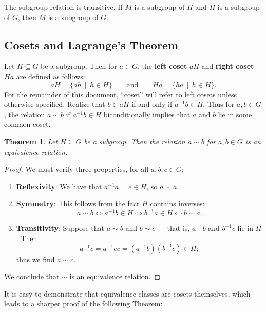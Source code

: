 \documentclass[11pt]{article}
\newtheorem{theorem}{Theorem}
\begin{document}
The subgroup relation is transitive. If $M$ is a subgroup of $H$ and $H$ is a subgroup of $G$, then $M$ is a subgroup of $G$.

\newpage


\subsection{Cosets and Lagrange's Theorem}

Let $H \subseteq G$ be a subgroup. Then for $a \in G$, the \textbf{left coset} $aH$ and \textbf{right coset} $Ha$ are defined as follows:
\[
  aH = \{ ah \, \mid \, h \in H \} \qquad \text{and} \qquad Ha = \{ ha \, \mid \, h \in H \}.
\]
For the remainder of this document, ``coset'' will refer to left cosets unless otherwise specified. Realize that $b \in aH$ if and only if $a^{-1}b \in H$. Thus for $a, b \in G$, the relation $a \sim b$ if $a^{-1}b \in H$ biconditionally implies that $a$ and $b$ lie in some common coset.

\begin{adjustwidth}{0.5cm}{}
  \begin{theorem}
    Let $H \subseteq G$ be a subgroup. Then the relation $a \sim b$ for $a, b \in G$ is an equivalence relation.
  \end{theorem}
  \begin{proof}
    We must verify three properties, for all $a, b, c \in G$:
    \begin{enumerate}
      \item \textbf{Reflexivity}: We have that $a^{-1}a = e \in H$, so $a \sim a$.
      \item \textbf{Symmetry}: This follows from the fact $H$ contains inverses:
      \[
        a \sim b \iff a^{-1}b \in H \iff b^{-1}a \in H \iff b \sim a.
      \]
      \item \textbf{Transitivity}: Suppose that $a \sim b$ and $b \sim c$ --- that is, $a^{-1}b$ and $b^{-1}c$ lie in $H$. Then
      \[
        a^{-1}c = a^{-1}ec = (a^{-1}b)(b^{-1}c) \in H;
      \]
      thus we find $a \sim c$.
    \end{enumerate}
    We conclude that $\sim$ is an equivalence relation.
  \end{proof}
\end{adjustwidth}

It is easy to demonstrate that equivalence classes are cosets themselves, which leads to a sharper proof of the following Theorem:
\end{document}

